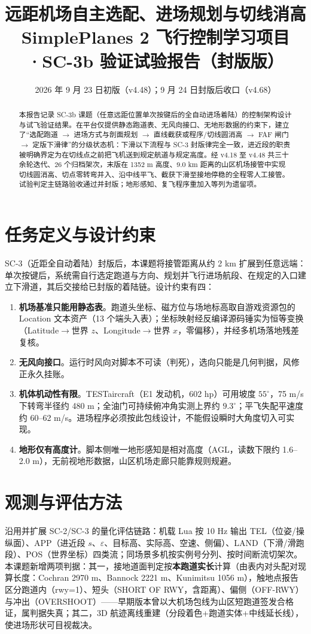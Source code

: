 \documentclass[12pt,UTF8,a4paper]{ctexart}
\title{\textbf{远距机场自主选配、进场规划与切线消高}\\[0.5em]
\large SimplePlanes 2 飞行控制学习项目·SC-3b 验证试验报告（封版版）}
\author{}
\date{2026 年 9 月 23 日初版（v4.48）；9 月 24 日封版后收口（v4.68）}
\begin{document}
\maketitle
\thispagestyle{empty}

\begin{abstract}
本报告记录 SC-3b 课题（任意远距位置单次按键后的全自动进场着陆）的控制架构设计与试飞验证结果。在平台仅提供静态跑道表、无风向接口、无地形数据的约束下，建立了``选配跑道 $\rightarrow$ 进场方式与剖面规划 $\rightarrow$ 直线截获或程序/切线圆消高 $\rightarrow$ FAF 闸门 $\rightarrow$ 定版下滑律''的分级状态机：下滑以下流程与 SC-3 封版律完全一致，进近段的职责被明确界定为在切线点之前把飞机送到规定航道与规定高度。经 v4.18 至 v4.48 共三十余轮迭代、26 个归档架次，末版在 1352 m 高度、9.0 km 距离的山区机场接管中实现切线圆消高、切点零转弯并入、沿中线平飞、截获下滑至接地停稳的全程零人工接管。试验判定主链路验收通过并封版；地形感知、复飞程序重加入等列为遗留项。
\end{abstract}

\section{任务定义与设计约束}
SC-3（近距全自动着陆）封版后，本课题将接管距离从约 2 km 扩展到任意远端：单次按键后，系统需自行选定跑道与方向、规划并飞行进场航段、在规定的入口建立下滑道，其后交接给已封版的着陆链。设计约束有四：

\begin{enumerate}
\item \textbf{机场基准只能用静态表}。跑道头坐标、磁方位与场地标高取自游戏资源包的 Location 文本资产（13 个端头入表）；坐标映射经反编译源码锤实为恒等变换（Latitude$\rightarrow$世界 $z$、Longitude$\rightarrow$世界 $x$，零偏移），并经多机场落地残差复核。
\item \textbf{无风向接口}。运行时风向对脚本不可读（判死），选向只能是几何判据，风修正永久挂账。
\item \textbf{机体机动性有限}。TESTaircraft（E1 发动机，602 hp）可用坡度 $55^\circ$，75 m/s 下转弯半径约 480 m；全油门可持续俯冲角实测上界约 $9.3^\circ$；平飞失配平速度约 60--62 m/s。进场程序必须按此包线设计，不能假设瞬时大角度切入可实现。
\item \textbf{地形仅有高度计}。脚本侧唯一地形感知是相对高度（AGL，读数下限约 1.6--2.0 m），无前视地形数据，山区机场走廊只能靠规则规避。
\end{enumerate}

\section{观测与评估方法}
沿用并扩展 SC-2/SC-3 的量化评估链路：机载 Lua 按 10 Hz 输出 TEL（位姿/操纵面）、APP（进近段 $s$、$\varepsilon$、目标高、实际高、空速、侧偏）、LAND（下滑/滑跑段）、POS（世界坐标）四类流；同场景多机按实例号分列、按时间断流切架次。本课题新增两项判据：其一，接地道面判定按\textbf{本跑道实长}计算（由表内对头配对现算长度：Cochran 2970 m、Bannock 2221 m、Kunimitsu 1056 m），触地点报告区分跑道内（rwy=1）、短头（SHORT OF RWY，含距离）、偏侧（OFF-RWY）与冲出（OVERSHOOT）——早期版本曾以大机场包线为山区短跑道签发合格证，属判据失真；其二，3D 航迹离线重建（分段着色+跑道实体+中线延长线），使进场形状可目视裁决。
\end{document}
